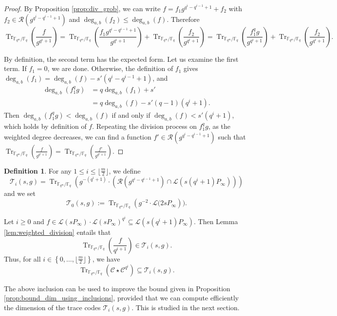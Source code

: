 \documentclass[a4paper]{article}
\theoremstyle{definition}
\newtheorem{definition}[thm]{Definition}
\theoremstyle{remark}
\newcommand{\calL}{\mathcal{L}}
\newcommand{\calC}{\mathcal{C}}
\newcommand{\calR}{\mathcal{R}}
\newcommand{\calT}{\mathcal{T}}
\newcommand{\fq}{\mathbb{F}_{q}}
\newcommand{\Tr}[1]{\operatorname{Tr}_{\mathbb{F}_{q^m}/\fq}\left(#1\right)}
\newcommand{\set}[1]{\left\{#1\right\}}
\newcommand{\degab}[1]{\deg_{a,b}\left(#1\right)}
\begin{document}
\begin{proof}
By Proposition \ref{prop:div_grob}, we can write $f=f_1 g^{q^i-q^{i-1}+1} +f_2$ with
 $f_2 \in \calR\left(g^{q^i-q^{i-1}+1}\right)$ and $\degab{f_2} \leq \degab{f}$. Therefore
 \[\Tr{\frac{f}{g^{q^i+1}}}=\Tr{\frac{f_1 g^{q^i-q^{i-1}+1}}{g^{q^i+1}}} +\Tr{\frac{f_2}{g^{q^i+1}}}= \Tr{\frac{f_1^qg}{g^{q^i+1}}} +\Tr{\frac{f_2}{g^{q^i+1}}}. \]
 
 By definition, the second term has the expected form. Let us examine the first term. If $f_1=0$, we are done. Otherwise, the definition of $f_1$ gives
$\degab{f_1} =\degab{f} - s'(q^i-q^{i-1}+1)$, and
 \begin{align*}
 \degab{f_1^qg}  &= q \degab{f_1} + s'\\
     &= q\degab{f} - s'(q-1)(q^i+1).
 \end{align*} 
Then  $\degab{f_1^qg} < \degab{f}$ if and only if $\degab{f} < s'(q^i+1)$, which holds by definition of $f$. Repeating the division process on $f_1^qg$, as the weighted degree decreases, we can find a function $f' \in \calR\left(g^{q^i-q^{i-1}+1}\right)$ such that $\Tr{\frac{f}{g^{q^i+1}}} = \Tr{\frac{f'}{g^{q^i+1}}} $.
\end{proof}
\begin{definition} \label{def:T_i's}
For any $1 \leq i \leq \lfloor\frac{m}{2}\rfloor$, we define
$$\calT_i(s,g)= \Tr{g^{-(q^i+1)}\cdot \left( \calR\left(g^{q^i-q^{i-1}+1}\right)  \cap \calL(s(q^i+1)P_\infty)\right)}$$
and we set $$\calT_0(s,g) := \Tr{g^{-2} \cdot \calL(2sP_\infty}).$$
\end{definition}

\noindent Let $i \geq 0$ and $f \in \calL(sP_\infty) \cdot \calL(sP_\infty)^{q^i} \subseteq \calL(s(q^i+1)P_\infty)$. Then 
Lemma \ref{lem:weighted_division} entails that 
$$\Tr{\dfrac{f}{q^{i+1}}} \in \calT_i(s,g).$$
Thus, for all $i \in \set{0,\dots,\lfloor \frac{m}{2} \rfloor}$, we have \begin{equation} \label{eq:Tr(C*C^q^i)_dans_T_i}
\Tr{\calC \star \calC^{q^i}} \subseteq \calT_i(s,g).
\end{equation}

The above inclusion can be used to improve the bound given in Proposition \ref{prop:bound_dim_using_inclusions}, provided that we can compute efficiently the dimension of the trace codes $\calT_i(s,g)$. This is studied in the next section.
\end{document}
